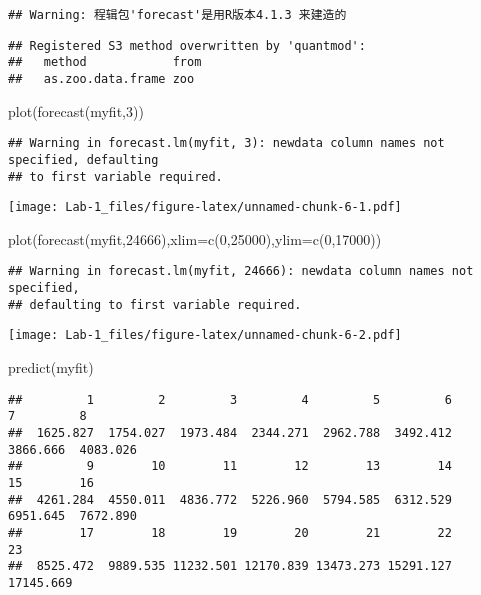 \documentclass[
]{article}
\newenvironment{Shaded}{\begin{snugshade}}{\end{snugshade}}
\newcommand{\AttributeTok}[1]{\textcolor[rgb]{0.77,0.63,0.00}{#1}}
\newcommand{\DecValTok}[1]{\textcolor[rgb]{0.00,0.00,0.81}{#1}}
\newcommand{\FunctionTok}[1]{\textcolor[rgb]{0.00,0.00,0.00}{#1}}
\newcommand{\NormalTok}[1]{#1}
\begin{document}
\begin{verbatim}
## Warning: 程辑包'forecast'是用R版本4.1.3 来建造的
\end{verbatim}

\begin{verbatim}
## Registered S3 method overwritten by 'quantmod':
##   method            from
##   as.zoo.data.frame zoo
\end{verbatim}

\begin{Shaded}
\begin{Highlighting}[]
\FunctionTok{plot}\NormalTok{(}\FunctionTok{forecast}\NormalTok{(myfit,}\DecValTok{3}\NormalTok{))}
\end{Highlighting}
\end{Shaded}

\begin{verbatim}
## Warning in forecast.lm(myfit, 3): newdata column names not specified, defaulting
## to first variable required.
\end{verbatim}

\texttt{[image: Lab-1\_files/figure-latex/unnamed-chunk-6-1.pdf]}

\begin{Shaded}
\begin{Highlighting}[]
\FunctionTok{plot}\NormalTok{(}\FunctionTok{forecast}\NormalTok{(myfit,}\DecValTok{24666}\NormalTok{),}\AttributeTok{xlim=}\FunctionTok{c}\NormalTok{(}\DecValTok{0}\NormalTok{,}\DecValTok{25000}\NormalTok{),}\AttributeTok{ylim=}\FunctionTok{c}\NormalTok{(}\DecValTok{0}\NormalTok{,}\DecValTok{17000}\NormalTok{))}
\end{Highlighting}
\end{Shaded}

\begin{verbatim}
## Warning in forecast.lm(myfit, 24666): newdata column names not specified,
## defaulting to first variable required.
\end{verbatim}

\texttt{[image: Lab-1\_files/figure-latex/unnamed-chunk-6-2.pdf]}

\begin{Shaded}
\begin{Highlighting}[]
\FunctionTok{predict}\NormalTok{(myfit)}
\end{Highlighting}
\end{Shaded}

\begin{verbatim}
##         1         2         3         4         5         6         7         8 
##  1625.827  1754.027  1973.484  2344.271  2962.788  3492.412  3866.666  4083.026 
##         9        10        11        12        13        14        15        16 
##  4261.284  4550.011  4836.772  5226.960  5794.585  6312.529  6951.645  7672.890 
##        17        18        19        20        21        22        23 
##  8525.472  9889.535 11232.501 12170.839 13473.273 15291.127 17145.669
\end{verbatim}
\end{document}
